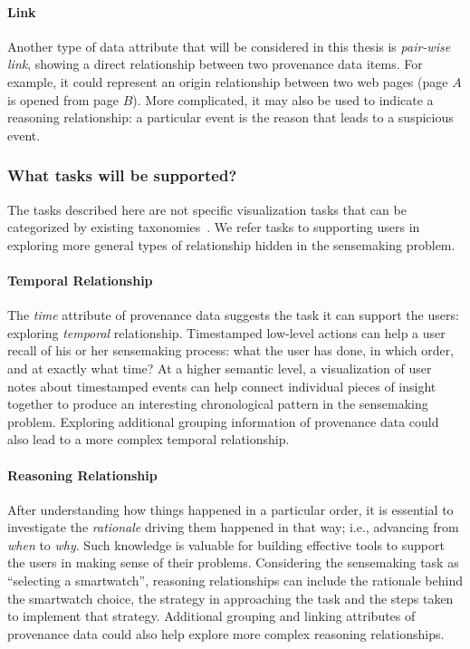 \paragraph{Link}
Another type of data attribute that will be considered in this thesis is \emph{pair-wise link}, showing a direct relationship between two provenance data items. For example, it could represent an origin relationship between two web pages (page $A$ is opened from page $B$). More complicated, it may also be used to indicate a reasoning relationship: a particular event is the reason that leads to a suspicious event.

\subsubsection{What tasks will be supported?}
The tasks described here are not specific visualization tasks that can be categorized by existing taxonomies~\cite{Amar2005, Yi2007, Brehmer2013}. We refer tasks to supporting users in exploring more general types of relationship hidden in the sensemaking problem.

\paragraph{Temporal Relationship}
The \emph{time} attribute of provenance data suggests the task it can support the users: exploring \emph{temporal} relationship. Timestamped low-level actions can help a user recall of his or her sensemaking process: what the user has done, in which order, and at exactly what time? At a higher semantic level, a visualization of user notes about timestamped events can help connect individual pieces of insight together to produce an interesting chronological pattern in the sensemaking problem. Exploring additional grouping information of provenance data could also lead to a more complex temporal relationship.

\paragraph{Reasoning Relationship}
After understanding how things happened in a particular order, it is essential to investigate the \emph{rationale} driving them happened in that way; i.e., advancing from \emph{when} to \emph{why}. Such knowledge is valuable for building effective tools to support the users in making sense of their problems. Considering the sensemaking task as ``selecting a smartwatch'', reasoning relationships can include the rationale behind the smartwatch choice, the strategy in approaching the task and the steps taken to implement that strategy. Additional grouping and linking attributes of provenance data could also help explore more complex reasoning relationships.

